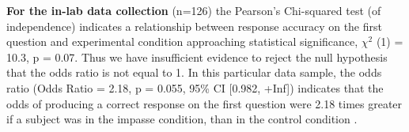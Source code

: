 \documentclass[
  letterpaper,
  DIV=11,
  numbers=noendperiod]{scrreprt}
\newenvironment{Shaded}{\begin{snugshade}}{\end{snugshade}}
\newcommand{\AttributeTok}[1]{\textcolor[rgb]{0.40,0.45,0.13}{#1}}
\newcommand{\ConstantTok}[1]{\textcolor[rgb]{0.56,0.35,0.01}{#1}}
\newcommand{\DecValTok}[1]{\textcolor[rgb]{0.68,0.00,0.00}{#1}}
\newcommand{\FunctionTok}[1]{\textcolor[rgb]{0.28,0.35,0.67}{#1}}
\newcommand{\NormalTok}[1]{\textcolor[rgb]{0.00,0.23,0.31}{#1}}
\newcommand{\OtherTok}[1]{\textcolor[rgb]{0.00,0.23,0.31}{#1}}
\newcommand{\SpecialCharTok}[1]{\textcolor[rgb]{0.37,0.37,0.37}{#1}}
\newcommand{\StringTok}[1]{\textcolor[rgb]{0.13,0.47,0.30}{#1}}
\begin{document}
\textbf{For the in-lab data collection} (n=126) the Pearson's
Chi-squared test (of independence) indicates a relationship between
response accuracy on the first question and experimental condition
approaching statistical significance, \(\chi^2\) (1) = 10.3, p = 0.07.
Thus we have insufficient evidence to reject the null hypothesis that
the odds ratio is not equal to 1. In this particular data sample, the
odds ratio (Odds Ratio = 2.18, p = 0.055, 95\% CI {[}0.982, +Inf{]})
indicates that the odds of producing a correct response on the first
question were 2.18 times greater if a subject was in the impasse
condition, than in the control condition .

\begin{Shaded}
\end{Shaded}
\end{document}
